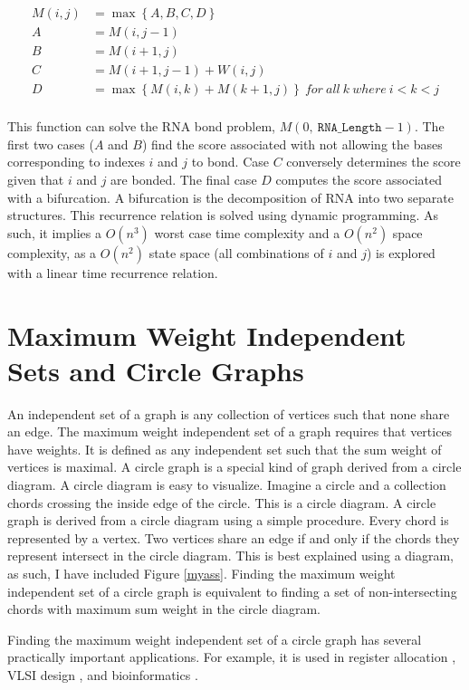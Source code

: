 \documentclass[12pt, a4paper]{article}
\begin{document}
\begin{align} \label{eq:nuss_eq}
	M(i, j) &= \max \left\lbrace A, B, C, D \right\rbrace \nonumber  \\
	A &= M(i, j-1) \nonumber \\
	B &= M(i+1, j) \nonumber \\
	C &= M(i+1, j-1) + W(i, j) \nonumber \\
	D &= \max \left\lbrace M(i, k) + M(k+1, j) \right\rbrace \: for \: all \: k \: where \: i < k < j \nonumber	\\
\end{align}

This function can solve the RNA bond problem, $M(0, \ \texttt{RNA\_Length}-1)$. The first two cases ($A$ and $B$) find the score associated with not allowing the bases corresponding to indexes $i$ and $j$ to bond. Case $C$ conversely determines the score given that $i$ and $j$ are bonded. The final case $D$ computes the score associated with a bifurcation. A bifurcation is the decomposition of RNA into two separate structures. This recurrence relation is solved using dynamic programming. As such, it implies a $O(n^3)$
worst case time complexity and a $O(n^2)$ space complexity, as a $O(n^2)$ state space (all combinations of $i$ and $j$) is explored
with a linear time recurrence relation.


\section{Maximum Weight Independent Sets and Circle Graphs}
An independent set of a graph is any collection of vertices such that none share an edge. The maximum weight independent set of a graph requires that vertices have weights. It is defined as any independent set such that the sum weight of vertices is maximal. A circle graph is a special kind of graph derived from a circle diagram. A circle diagram is easy to visualize. Imagine a circle and a collection chords crossing the inside edge of the circle. This is a circle diagram. A circle graph is derived from a circle diagram using a simple procedure. Every chord is represented by a vertex. Two vertices share an edge if and only if the chords they represent intersect in the circle diagram. This is best explained using a diagram, as such, I have included Figure \ref{myass}. Finding the maximum weight independent set of a circle graph is equivalent to finding a set of non-intersecting chords with maximum sum weight in the circle diagram.

Finding the maximum weight independent set of a circle graph has several practically important applications. For example, it is used in register allocation \cite{de1999graph}, VLSI design \cite{cong1990over}, and bioinformatics \cite{swenson2009maximum}.
\end{document}
